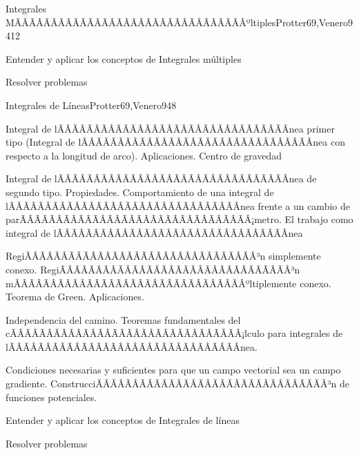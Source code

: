 \begin{sumilla}
\begin{unit}{Integrales MÃÂÃÂÃÂÃÂÃÂÃÂÃÂÃÂÃÂÃÂÃÂÃÂÃÂÃÂÃÂÃÂºltiples}{Protter69,Venero94}{12}
   \begin{objetivos}
         \item  Entender y aplicar los conceptos de Integrales m\'ultiples
         \item  Resolver problemas
   \end{objetivos}
\end{unit}

\begin{unit}{Integrales de L\'ineas}{Protter69,Venero94}{8}
   \begin{topicos}
	\item  Integral de lÃÂÃÂÃÂÃÂÃÂÃÂÃÂÃÂÃÂÃÂÃÂÃÂÃÂÃÂÃÂÃÂ­nea primer tipo (Integral de lÃÂÃÂÃÂÃÂÃÂÃÂÃÂÃÂÃÂÃÂÃÂÃÂÃÂÃÂÃÂÃÂ­nea con respecto a la longitud de arco). Aplicaciones. Centro de gravedad
	\item  Integral de lÃÂÃÂÃÂÃÂÃÂÃÂÃÂÃÂÃÂÃÂÃÂÃÂÃÂÃÂÃÂÃÂ­nea de segundo tipo. Propiedades. Comportamiento de una integral de lÃÂÃÂÃÂÃÂÃÂÃÂÃÂÃÂÃÂÃÂÃÂÃÂÃÂÃÂÃÂÃÂ­nea frente a un cambio de parÃÂÃÂÃÂÃÂÃÂÃÂÃÂÃÂÃÂÃÂÃÂÃÂÃÂÃÂÃÂÃÂ¡metro. El trabajo como integral de lÃÂÃÂÃÂÃÂÃÂÃÂÃÂÃÂÃÂÃÂÃÂÃÂÃÂÃÂÃÂÃÂ­nea
	\item  RegiÃÂÃÂÃÂÃÂÃÂÃÂÃÂÃÂÃÂÃÂÃÂÃÂÃÂÃÂÃÂÃÂ³n simplemente conexo. RegiÃÂÃÂÃÂÃÂÃÂÃÂÃÂÃÂÃÂÃÂÃÂÃÂÃÂÃÂÃÂÃÂ³n mÃÂÃÂÃÂÃÂÃÂÃÂÃÂÃÂÃÂÃÂÃÂÃÂÃÂÃÂÃÂÃÂºltiplemente conexo. Teorema de Green. Aplicaciones.
	\item  Independencia del camino. Teoremas fundamentales del cÃÂÃÂÃÂÃÂÃÂÃÂÃÂÃÂÃÂÃÂÃÂÃÂÃÂÃÂÃÂÃÂ¡lculo para integrales de lÃÂÃÂÃÂÃÂÃÂÃÂÃÂÃÂÃÂÃÂÃÂÃÂÃÂÃÂÃÂÃÂ­nea.
	\item Condiciones necesarias y suficientes para que un campo vectorial sea un campo gradiente. ConstrucciÃÂÃÂÃÂÃÂÃÂÃÂÃÂÃÂÃÂÃÂÃÂÃÂÃÂÃÂÃÂÃÂ³n de funciones potenciales.
   \end{topicos}

   \begin{objetivos}
         \item  Entender y aplicar los conceptos de Integrales de l\'ineas
         \item  Resolver problemas
   \end{objetivos}
\end{unit}


\end{sumilla}
